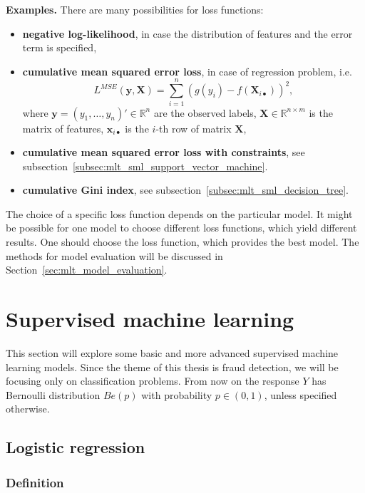 \documentclass[12pt, a4paper]{report}
\newcommand{\R}{\mathbb{R}}
\theoremstyle{plain}
\theoremstyle{plain}
\theoremstyle{remark}
\begin{document}
\textbf{Examples.} There are many possibilities for loss functions:
\begin{itemize}
\item \textbf{negative log-likelihood}, in case the distribution of features and the error term is specified,
\item \textbf{cumulative mean squared error loss}, in case of regression problem, i.e.
$$
L^{MSE}(\pmb{y},\pmb{X}) = \sum_{i=1}^n (g(y_i) - f(\pmb{X}_{i\bullet}))^2,
$$
where $\pmb{y} = (y_1,\ldots,y_n)'\in\R^n$ are the observed labels, $\pmb{X}\in\R^{n\times m}$ is the matrix of features, $\pmb{x}_{i\bullet}$ is the $i$-th row of matrix $\pmb{X}$,
\item \textbf{cumulative mean squared error loss with constraints}, see subsection~\ref{subsec:mlt_sml_support_vector_machine}.
\item \textbf{cumulative Gini index}, see subsection~\ref{subsec:mlt_sml_decision_tree}.
\end{itemize}

The choice of a specific loss function depends on the particular model. It might be possible for one model to choose different loss functions, which yield different results. One should choose the loss function, which provides the best model. The methods for model evaluation will be discussed in Section~\ref{sec:mlt_model_evaluation}.

\section{Supervised machine learning}
\label{sec:mlt_supervised_machine_learning}

This section will explore some basic and more advanced supervised machine learning models. Since the theme of this thesis is fraud detection, we will be focusing only on classification problems. From now on the response $Y$ has Bernoulli distribution $Be(p)$ with probability $p\in(0,1)$, unless specified otherwise.

\subsection{Logistic regression}
\label{subsec:mlt_sml_logistic_regression}

\subsubsection{Definition}
\label{subsubsec:mlt_sml_lr_definition}
\end{document}
